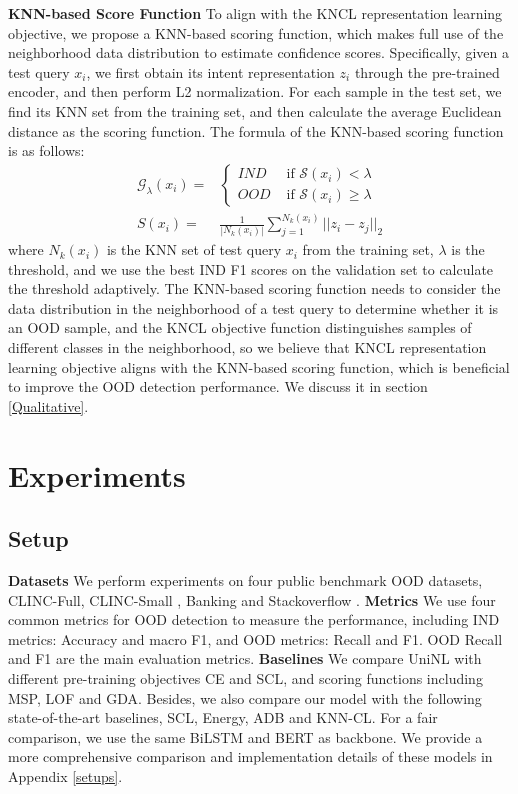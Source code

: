 \documentclass[11pt]{article}
\begin{document}
\textbf{KNN-based Score Function} 
To align with the KNCL representation learning objective, we propose a KNN-based scoring function, which makes full use of the neighborhood data distribution to estimate confidence scores. Specifically, given a test query $x_{i}$, we first obtain its intent representation $z_{i}$ through the pre-trained encoder, and then perform L2 normalization. For each sample in the test set, we find its KNN set from the training set, and then calculate the average Euclidean distance as the scoring function. The formula of the KNN-based scoring function is as follows:
{\setlength{\abovedisplayskip}{0.2cm}
\setlength{\belowdisplayskip}{0.2cm}
\begin{align}
    \mathcal{G}_{\lambda}(x_{i})=& \begin{cases}{IND} & \text { if } {\mathcal{S}(x_{i})} < \lambda \\ {OOD} & \text { if } {\mathcal{S}(x_{i})} \geq \lambda \end{cases} \\
{S}(x_{i}) =&\frac{1}{|{N}_{k}(x_{i})|} \sum_{j=1}^{{N}_{k}(x_{i})}{||z_{i}-z_{j}||_2}
\end{align}}
where $N_{k}(x_i)$ is the KNN set of test query $x_{i}$ from the training set, $\lambda$ is the threshold, and we use the best IND F1 scores on the validation set to calculate the threshold adaptively. The KNN-based scoring function needs to consider the data distribution in the neighborhood of a test query to determine whether it is an OOD sample, and the KNCL objective function distinguishes samples of different classes in the neighborhood, so we believe that KNCL representation learning objective aligns with the KNN-based scoring function, which is beneficial to improve the OOD detection performance. We discuss it in section \ref{Qualitative}.


\section{Experiments}

\subsection{Setup}
\textbf{Datasets} We perform experiments on four public benchmark OOD datasets, CLINC-Full, CLINC-Small \cite{Larson2019AnED}, Banking \cite{casanueva2020efficient} and Stackoverflow \cite{xu2015short}. \textbf{Metrics} We use four common metrics for OOD detection to measure the performance, including IND metrics: Accuracy and macro F1, and OOD metrics: Recall and F1. OOD Recall and F1 are the main evaluation metrics. \textbf{Baselines} We compare UniNL with different pre-training objectives CE and SCL, and scoring functions including MSP, LOF and GDA. Besides, we also compare our model with the following state-of-the-art baselines,  SCL\cite{zeng-etal-2021-modeling}, Energy\cite{ouyang-etal-2021-energy}, ADB\cite{Zhang2021DeepOI} and KNN-CL\cite{zhou-etal-2022-knn}. For a fair comparison, we use the same BiLSTM and BERT as backbone. We provide a more comprehensive comparison and implementation details of these models in Appendix \ref{setups}.
\end{document}
